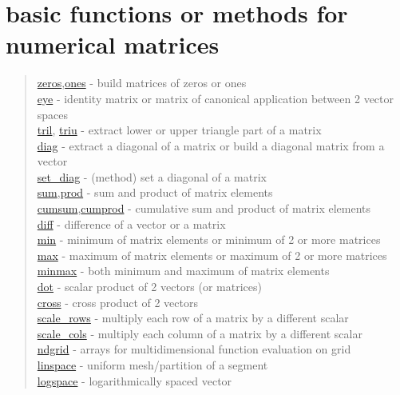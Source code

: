 \chapter*{basic functions or methods for numerical matrices}
\hypertarget{basicnumarrays}{}
\begin{quote}
\noindent
\hyperlink{zeros}{zeros},\hyperlink{ones}{ones} - build matrices of zeros or ones \\
\hyperlink{eye}{eye} - identity matrix or matrix of canonical application between 2 vector spaces \\
\hyperlink{tril}{tril}, \hyperlink{triu}{triu} - extract lower or upper triangle part of a matrix \\
\hyperlink{diag}{diag} - extract a diagonal of a matrix or build a diagonal matrix from a vector \\
\hyperlink{set_diag}{set\_diag} - (method) set a diagonal of a matrix \\
\hyperlink{sum}{sum},\hyperlink{prod}{prod} - sum and product of matrix elements \\
\hyperlink{cumsum}{cumsum},\hyperlink{cumprod}{cumprod} - cumulative sum and product of matrix elements \\
\hyperlink{diff}{diff} - difference of a vector or a matrix \\
\hyperlink{min}{min} - minimum of matrix elements or minimum of 2 or more matrices \\
\hyperlink{max}{max} - maximum of matrix elements or maximum of 2 or more matrices \\
\hyperlink{minmax}{minmax} - both minimum and maximum of matrix elements\\
\hyperlink{dot}{dot} - scalar product of 2 vectors (or matrices) \\
\hyperlink{cross}{cross} - cross product of 2 vectors \\
\hyperlink{scale_rows}{scale\_rows} - multiply each row of a matrix by a different scalar \\
\hyperlink{scale_cols}{scale\_cols} - multiply each column of a matrix by a different scalar \\
\hyperlink{ndgrid}{ndgrid} - arrays for multidimensional function evaluation on grid \\
\hyperlink{linspace}{linspace} - uniform mesh/partition of a segment \\
\hyperlink{logspace}{logspace} - logarithmically spaced vector \\
\end{quote}
 
 
  
  
  
  
 
 
 
 
 
 

  
  
  

